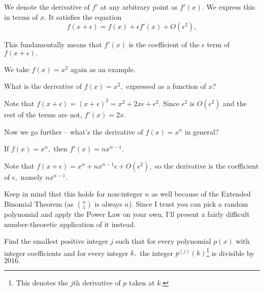 \documentclass{article}
\begin{document}
\begin{defi}
We denote the derivative of $f'$ at any arbitrary point as $f'(x).$ We express this in terms of $x.$ It satisfies the equation
\[f(x+\epsilon)=f(x)+\epsilon f'(x)+O(\epsilon^2),\]
\end{defi}

This fundamentally means that $f'(x)$ is the coefficient of the $\epsilon$ term of $f(x+\epsilon).$

We take $f(x)=x^2$ again as an example.

\begin{exam}
What is the derivative of $f(x)=x^2,$ expressed as a function of $x?$
\end{exam}

\begin{sol}
Note that $f(x+\epsilon)=(x+\epsilon)^2=x^2+2x\epsilon+\epsilon^2.$ Since $\epsilon^2$ is $O(\epsilon^2)$ and the rest of the terms are not, $f'(x)=2x.$
\end{sol}

Now we go further -- what's the derivative of $f(x)=x^n$ in general?

\begin{theo}
If $f(x)=x^n,$ then $f'(x)=nx^{n-1}.$
\end{theo}

\begin{pro}
Note that $f(x+\epsilon)=x^n+nx^{n-1}\epsilon+O(\epsilon^2),$ so the derivative is the coefficient of $\epsilon,$ namely $nx^{n-1}.$
\end{pro}

Keep in mind that this holds for non-integer $n$ as well because of the Extended Binomial Theorem (as $\binom{n}{1}$ is always $n$). Since I trust you can pick a random polynomial and apply the Power Law on your own, I'll present a fairly difficult number-theoretic application of it instead.

\begin{exam}[Putnam 2016/A1]
Find the smallest positive integer $j$ such that for every polynomial $p(x)$ with integer coefficients and for every integer $k,$ the integer $p^{(j)}(k)$\footnote{This denotes the $j$th derivative of $p$ taken at $k.$} is divisible by $2016.$
\end{exam}
\end{document}
